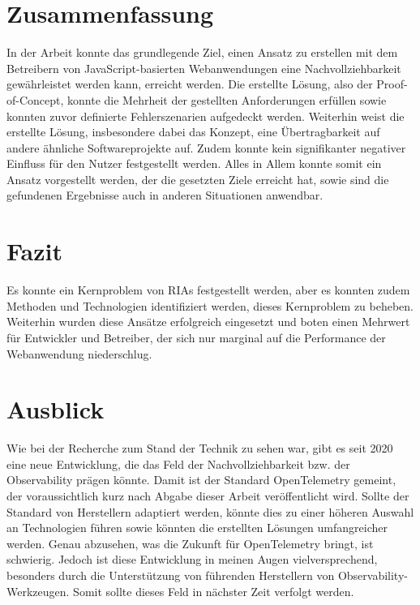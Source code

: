 
\section{Zusammenfassung}

In der Arbeit konnte das grundlegende Ziel, einen Ansatz zu erstellen mit dem Betreibern von JavaScript-basierten Webanwendungen eine Nachvollziehbarkeit gewährleistet werden kann, erreicht werden. Die erstellte Lösung, also der Proof-of-Concept, konnte die Mehrheit der gestellten Anforderungen erfüllen sowie konnten zuvor definierte Fehlerszenarien aufgedeckt werden. Weiterhin weist die erstellte Lösung, insbesondere dabei das Konzept, eine Übertragbarkeit auf andere ähnliche Softwareprojekte auf. Zudem konnte kein signifikanter negativer Einfluss für den Nutzer festgestellt werden. Alles in Allem konnte somit ein Ansatz vorgestellt werden, der die gesetzten Ziele erreicht hat, sowie sind die gefundenen Ergebnisse auch in anderen Situationen anwendbar.

\section{Fazit}

Es konnte ein Kernproblem von RIAs festgestellt werden, aber es konnten zudem Methoden und Technologien identifiziert werden, dieses Kernproblem zu beheben. Weiterhin wurden diese Ansätze erfolgreich eingesetzt und boten einen Mehrwert für Entwickler und Betreiber, der sich nur marginal auf die Performance der Webanwendung niederschlug.

\section{Ausblick}

Wie bei der Recherche zum Stand der Technik zu sehen war, gibt es seit 2020 eine neue Entwicklung, die das Feld der Nachvollziehbarkeit bzw. der Observability prägen könnte. Damit ist der Standard OpenTelemetry gemeint, der voraussichtlich kurz nach Abgabe dieser Arbeit veröffentlicht wird. Sollte der Standard von Herstellern adaptiert werden, könnte dies zu einer höheren Auswahl an Technologien führen sowie könnten die erstellten Lösungen umfangreicher werden. Genau abzusehen, was die Zukunft für OpenTelemetry bringt, ist schwierig. Jedoch ist diese Entwicklung in meinen Augen vielversprechend, besonders durch die Unterstützung von führenden Herstellern von Observability-Werkzeugen. Somit sollte dieses Feld in nächster Zeit verfolgt werden.
